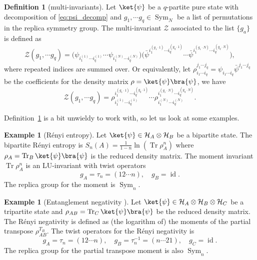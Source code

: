 \documentclass[11pt,oneside,letterpaper]{article}
\numberwithin{equation}{section}
\theoremstyle{definition}
\newtheorem{definition}[theorem]{Definition}
\newtheorem{example}[theorem]{Example}
\theoremstyle{remark}
\DeclareMathOperator{\tr}{Tr}
\DeclareMathOperator{\id}{id}
\DeclareMathOperator{\Sym}{Sym}
\begin{document}
\begin{definition}[multi-invariants]
  \label{def:multi-invariants}
  Let $\ket{\psi}$ be a $q$-partite pure state with decomposition of \eqref{eq:psi_decomp} and $g_1,\cdots g_q\in \Sym_N$ be a list of permutations in the replica symmetry group. The multi-invariant $\mathcal{Z}$ associated to the list $\{g_a\}$ is defined as
  \begin{equation}
    \mathcal{Z}(g_1,\cdots g_q) = \Big(\psi_{i^{(1)}_1\cdots i^{(1)}_q}\cdots\psi_{i^{(N)}_1\cdots i^{(N)}_q}\Big) \Big(\bar{\psi}^{i^{(g_1\cdot1)}_1\cdots i^{(g_q\cdot1)}_q}\cdots\bar{\psi}^{i^{(g_1\cdot N)}_1\cdots i^{(g_q\cdot N)}_q}\Big),
  \end{equation}
  where repeated indices are summed over.
  Or equivalently, let $\rho_{i_1\cdots i_q}^{j_1\cdots j_q}=\psi_{i_1\cdots i_q}\bar{\psi}^{j_1\cdots j_q}$ be the coefficients for the density matrix $\rho=\ket{\psi}\bra{\psi}$, we have
  \begin{equation}
    \mathcal{Z}(g_1,\cdots g_q) = \rho_{i^{(1)}_1\cdots i^{(1)}_q}^{i^{(g_1\cdot 1)}_1\cdots i^{(g_q\cdot1 )}_q}\cdots\rho_{i^{(N)}_1\cdots i^{(N)}_q}^{i^{(g_1\cdot N)}_1\cdots i^{(g_q\cdot N )}_q}.
  \end{equation}
\end{definition}
Definition~\ref{def:multi-invariants} is a bit unwieldy to work with, so let us look at some examples.
\begin{example}[R\'enyi entropy]
Let $\ket{\psi}\in \mathcal{H}_A\otimes \mathcal{H}_B$ be a bipartite state. The bipartite R\'enyi entropy is $S_n(A)=\frac{1}{1-n}\ln (\tr \rho^n_A)$ where $\rho_A=\tr_B\ket{\psi}\bra{\psi}$ is the reduced density matrix. The moment invariant $\tr \rho^n_A$ is an LU-invariant with twist operators
\begin{equation}
  g_A = \tau_n = (12\cdots n), \quad g_B = \id.
\end{equation}
The replica group for the moment is $\Sym_n$.
\end{example}
\begin{example}[Entanglement negativity \cite{Vidal:2002zz}]
  \label{ex:negativity}
  Let $\ket{\psi}\in \mathcal{H}_A \otimes \mathcal{H}_B \otimes \mathcal{H}_C$ be a tripartite state and $\rho_{AB}=\tr_C \ket{\psi}\bra{\psi}$ be the reduced density matrix. The R\'enyi negativity is defined as (the logarithm of) the moments of the partial transpose $\rho^{T_B}_{AB}$. The twist operators for the R\'enyi negativity is
  \begin{equation}
    g_A = \tau_n = (12\cdots n),\quad g_B = \tau^{-1}_n = (n\cdots 21), \quad g_C=\id.
  \end{equation}
  The replica group for the partial transpose moment is also $\Sym_n$.
\end{example}
\end{document}
